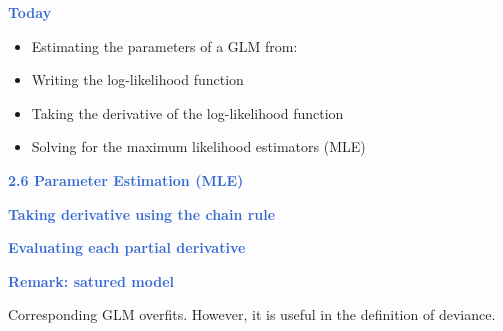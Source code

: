 \documentclass[aspectratio=169,professionalfonts,mathserif,handout]{beamer}
\newcommand{\highlight}[1]{\textcolor{Highlight}{\bf #1}}
\renewcommand{\(}{\left(}
\renewcommand{\)}{\right)}
\renewcommand{\[}{\left[}
\renewcommand{\]}{\right]}
\newcommand{\mytitle}[1]{\vspace*{-1mm}%
  \centerline{\highlight{\Large #1}}\vspace*{3mm}}
\newenvironment{slidebox}{%
  \begin{minipage}[c][7.5cm][t]{14.4cm}\raggedright}{%
  \end{minipage}}
\begin{document}
\begin{frame}\begin{slidebox}
\mytitle{Today}

\begin{itemize}
    \item Estimating the parameters of a GLM from: 
    \pause
    \item Writing the log-likelihood function
    \pause
    \item Taking the derivative of the log-likelihood function
    \pause
    \item Solving for the maximum likelihood estimators (MLE)
\end{itemize}
\end{slidebox}\end{frame}

\begin{frame}\begin{slidebox}
\mytitle{2.6 Parameter Estimation (MLE)}
\end{slidebox}\end{frame}

\begin{frame}\begin{slidebox}
\mytitle{Taking derivative using the chain rule}
\end{slidebox}\end{frame}

\begin{frame}\begin{slidebox}
\mytitle{Evaluating each partial derivative}
\end{slidebox}\end{frame}


\begin{frame}\begin{slidebox}
\mytitle{Remark: satured model}

Corresponding GLM overfits. However, it is useful in the definition of deviance.

\end{slidebox}\end{frame}
\end{document}
